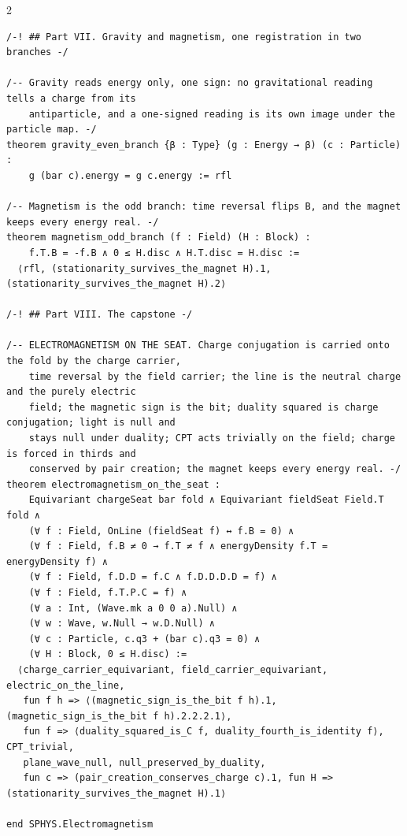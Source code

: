 \documentclass[10pt]{article}
\begin{document}
\begin{multicols}{2}
\begin{Verbatim}[fontsize=\fontsize{6.0}{6.9}\selectfont,breaklines,breakanywhere,breaksymbolleft={}]
/-! ## Part VII. Gravity and magnetism, one registration in two branches -/

/-- Gravity reads energy only, one sign: no gravitational reading tells a charge from its
    antiparticle, and a one-signed reading is its own image under the particle map. -/
theorem gravity_even_branch {β : Type} (g : Energy → β) (c : Particle) :
    g (bar c).energy = g c.energy := rfl

/-- Magnetism is the odd branch: time reversal flips B, and the magnet keeps every energy real. -/
theorem magnetism_odd_branch (f : Field) (H : Block) :
    f.T.B = -f.B ∧ 0 ≤ H.disc ∧ H.T.disc = H.disc :=
  ⟨rfl, (stationarity_survives_the_magnet H).1, (stationarity_survives_the_magnet H).2⟩

/-! ## Part VIII. The capstone -/

/-- ELECTROMAGNETISM ON THE SEAT. Charge conjugation is carried onto the fold by the charge carrier,
    time reversal by the field carrier; the line is the neutral charge and the purely electric
    field; the magnetic sign is the bit; duality squared is charge conjugation; light is null and
    stays null under duality; CPT acts trivially on the field; charge is forced in thirds and
    conserved by pair creation; the magnet keeps every energy real. -/
theorem electromagnetism_on_the_seat :
    Equivariant chargeSeat bar fold ∧ Equivariant fieldSeat Field.T fold ∧
    (∀ f : Field, OnLine (fieldSeat f) ↔ f.B = 0) ∧
    (∀ f : Field, f.B ≠ 0 → f.T ≠ f ∧ energyDensity f.T = energyDensity f) ∧
    (∀ f : Field, f.D.D = f.C ∧ f.D.D.D.D = f) ∧
    (∀ f : Field, f.T.P.C = f) ∧
    (∀ a : Int, (Wave.mk a 0 0 a).Null) ∧
    (∀ w : Wave, w.Null → w.D.Null) ∧
    (∀ c : Particle, c.q3 + (bar c).q3 = 0) ∧
    (∀ H : Block, 0 ≤ H.disc) :=
  ⟨charge_carrier_equivariant, field_carrier_equivariant, electric_on_the_line,
   fun f h => ⟨(magnetic_sign_is_the_bit f h).1, (magnetic_sign_is_the_bit f h).2.2.2.1⟩,
   fun f => ⟨duality_squared_is_C f, duality_fourth_is_identity f⟩, CPT_trivial,
   plane_wave_null, null_preserved_by_duality,
   fun c => (pair_creation_conserves_charge c).1, fun H => (stationarity_survives_the_magnet H).1⟩

end SPHYS.Electromagnetism


\end{Verbatim}
\end{multicols}
\end{document}
